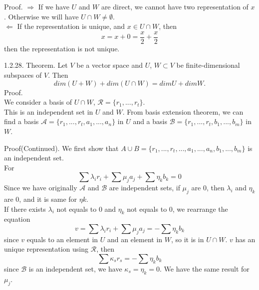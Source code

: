 \documentclass[hyperref={pdfpagelabels=true}]{beamer}
\newcommand{\structb}[1]{\textcolor[rgb]{0.2,0.2,0.7}{#1}}
\newcommand{\<}{\langle}
\renewcommand{\>}{\rangle}
\begin{document}
\begin{frame}
    \begin{block}{Proof.}
        \structb{$\Rightarrow$} If we have $U$ and $W$ are direct, we cannot have two representation of $x$. Otherwise we will have $U \cap W \neq \emptyset$.\\
        \structb{$\Leftarrow$} If the representation is unique, and $x \in U \cap W$, then 
        \[x = x + 0 = \frac{x}{2}+\frac{x}{2}\]
        then the representation is not unique.
    \end{block}
    \begin{block}{1.2.28. Theorem.}
        Let $V$ be a vector space and $U$, $W \subset V$ be finite-dimensional subspaces of $V$. Then 
        \[dim(U+W) + dim(U \cap W) = dim U + dim W.\]
        \structb{Proof.}\\
           We consider a basis of $U \cap W$, $\mathcal{R} = \{r_1,...,r_{t}\}$.\\
           This is an independent set in $U$ and $W$. From basis extension theorem, we can find a basis $\mathcal{A} = \{r_{1},...,r_{t},a_{1},...,a_{n}\}$ in $U$ and a basis $\mathcal{B} = \{r_{1},...,r_{t},b_{1},...,b_{m}\}$ in $W$.  
    \end{block}
\end{frame}
\begin{frame}
    \begin{block}{Proof(Continued).}
        We first show that $A \cup B = \{r_{1},...,r_{t},...,a_{1},...,a_{n},b_{1},...,b_{m}\}$ is an independent set.\\
        For
        \[\sum \lambda_{i} r_{i}+\sum \mu_{j} a_{j} +\sum \eta_{k} b_{k} = 0\]
        Since we have originally $\mathcal{A}$ and $\mathcal{B}$ are independent sets, if $\mu_{j}$ are 0, then $\lambda_{i}$ and $\eta_{k}$ are 0, and it is same for $\eta{k}$.\\
        If there exists $\lambda_{i}$ not equals to 0 and $\eta_{k}$ not equals to 0, we rearrange the equation 
        \[v = \sum \lambda_{i}r_{i}+\sum \mu_{j} a_{j} = -\sum \eta_{k} b_{k}\]
        since $v$ equals to an element in $U$ and an element in $W$, so it is in $U \cap W$. $v$ has an unique representation using $\mathcal{R}$, then 
        \[\sum \kappa_{s} r_{s} = -\sum \eta_{k} b_{k}\]
        since $\mathcal{B}$ is an independent set, we have $\kappa_{s} = \eta_{k} = 0$. We have the same result for $\mu_{j}$.\\
    \end{block}
\end{frame}
\end{document}
